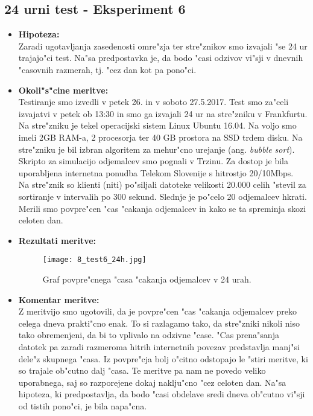 \newpage
\subsection{24 urni test - Eksperiment 6}
\begin{itemize}
	\item \textbf{Hipoteza: }  \\
		Zaradi ugotavljanja zasedenosti omre"zja ter stre"znikov smo izvajali "se 24 ur trajajo"ci test. Na"sa predpostavka je, da bodo "casi odzivov vi"sji v dnevnih "casovnih razmerah, tj. "cez dan kot pa pono"ci.

	\item \textbf{Okoli"s"cine meritve: } \\
		Testiranje smo izvedli v petek 26. in v soboto 27.5.2017. Test smo za"celi izvajatvi v petek ob 13:30 in smo ga izvajali 24 ur na stre"zniku v Frankfurtu. Na stre"zniku je tekel operacijski sistem Linux Ubuntu 16.04. Na voljo smo imeli 2GB RAM-a, 2 procesorja ter 40 GB prostora na SSD trdem disku. Na stre"zniku je bil izbran algoritem za mehur"cno urejanje (ang. \textit{bubble sort}).\\ Skripto za simulacijo odjemalcev smo pognali v Trzinu. Za dostop je bila uporabljena internetna ponudba Telekom Slovenije s hitrostjo 20/10Mbps.\\ Na stre"znik so klienti (niti) po"siljali datoteke velikosti 20.000 celih "stevil za sortiranje v intervalih po 300 sekund. Slednje je po"celo 20 odjemalcev hkrati. Merili smo povpre"cen "cas "cakanja odjemalcev in kako se ta spreminja skozi celoten dan.

 	\item \textbf{Rezultati meritve: }  \\
		\begin{figure}[h]
  		\centering
  		  \texttt{[image: 8\_test6\_24h.jpg]}
  		\caption{Graf povpre"cnega "casa "cakanja odjemalcev v 24 urah. }
  		\label{8_graf_racunska_moc_50}
		\end{figure}

	\item \textbf{Komentar meritve: } \\
		Z meritvijo smo ugotovili, da je povpre"cen "cas "cakanja odjemalcev preko celega dneva prakti"cno enak. To si razlagamo tako, da stre"zniki nikoli niso tako obremenjeni, da bi to vplivalo na odzivne "case. "Cas prena"sanja datotek pa zaradi razmeroma hitrih internetnih povezav predstavlja manj"si dele"z skupnega "casa. Iz povpre"cja bolj o"citno odstopajo le "stiri meritve, ki so trajale ob"cutno dalj "casa. Te meritve pa nam ne povedo veliko uporabnega, saj so razporejene dokaj naklju"cno "cez celoten dan. Na"sa hipoteza, ki predpostavlja, da bodo "casi obdelave sredi dneva ob"cutno vi"sji od tistih pono"ci, je bila napa"cna.
\end{itemize}

